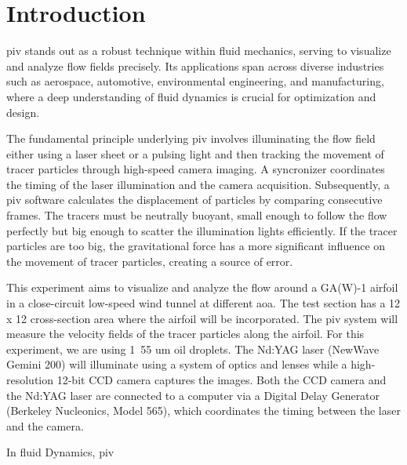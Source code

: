 \chapter{Introduction}
\label{cp:introduction}
\acrfull{piv} stands out as a robust technique within fluid mechanics, serving to visualize and analyze flow fields precisely. Its applications span across diverse industries such as aerospace, automotive, environmental engineering, and manufacturing, where a deep understanding of fluid dynamics is crucial for optimization and design.

The fundamental principle underlying \acrshort{piv} involves illuminating the flow field either using a laser sheet or a pulsing light and then tracking the movement of tracer particles through high-speed camera imaging. A syncronizer coordinates the timing of the laser illumination and the camera acquisition. Subsequently, a \acrshort{piv} software calculates the displacement of particles by comparing consecutive frames. The tracers must be neutrally buoyant, small enough to follow the flow perfectly but big enough to scatter the illumination lights efficiently. If the tracer particles are too big, the gravitational force has a more significant influence on the movement of tracer particles, creating a source of error. 

This experiment aims to visualize and analyze the flow around a GA(W)-1 airfoil in a close-circuit low-speed wind tunnel at different \acrshort{aoa}. The test section has a 12 x 12 cross-section area where the airfoil will be incorporated. The \acrshort{piv} system will measure the velocity fields of the tracer particles along the airfoil. For this experiment, we are using 1~55 um oil droplets. The Nd:YAG laser (NewWave Gemini 200) will illuminate using a system of optics and lenses while a high-resolution 12-bit CCD camera captures the images. Both the  CCD camera and the Nd:YAG laser are connected to a computer via a Digital Delay Generator (Berkeley Nucleonics, Model 565), which coordinates the timing between the laser and the camera. 


In fluid Dynamics, \acrshort{piv} 